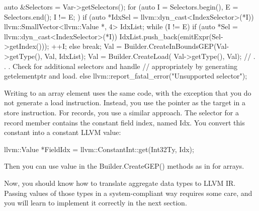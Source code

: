 \begin{cpp}
auto &Selectors = Var->getSelectors();
for (auto I = Selectors.begin(), E = Selectors.end();
        I != E; ) {
    if (auto *IdxSel =
            llvm::dyn_cast<IndexSelector>(*I)) {
        llvm::SmallVector<llvm::Value *, 4> IdxList;
        while (I != E) {
            if (auto *Sel =
                    llvm::dyn_cast<IndexSelector>(*I)) {
                IdxList.push_back(emitExpr(Sel->getIndex()));
                ++I;
            } else
                break;
        }
        Val = Builder.CreateInBoundsGEP(Val->getType(), Val, IdxList);
        Val = Builder.CreateLoad(
            Val->getType(), Val);
    }
    // . . . Check for additional selectors and handle
    // appropriately by generating getelementptr and load.
    else {
        llvm::report_fatal_error("Unsupported selector");
    }
}
\end{cpp}

Writing to an array element uses the same code, with the exception that you do not generate a load instruction. Instead, you use the pointer as the target in a store instruction. For records, you use a similar approach. The selector for a record member contains the constant field index, named Idx. You convert this constant into a constant LLVM value:

\begin{cpp}
llvm::Value *FieldIdx = llvm::ConstantInt::get(Int32Ty, Idx);
\end{cpp}

Then you can use value in the Builder.CreateGEP() methods as in for arrays.

Now, you should know how to translate aggregate data types to LLVM IR. Passing values of those types in a system-compliant way requires some care, and you will learn to implement it correctly in the next section.













